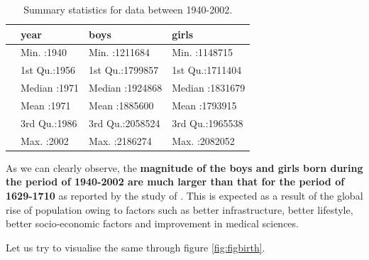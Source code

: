 \documentclass[11pt,a4paper,]{article}
\begin{document}
\begin{table}[H]

\caption{\label{tab:sumstatpre}Summary statistics for data between 1940-2002.}
\centering
\begin{tabular}[t]{l|l|l|l}
\hline
  &      year &      boys &     girls\\
\hline
 & Min.   :1940 & Min.   :1211684 & Min.   :1148715\\
\hline
 & 1st Qu.:1956 & 1st Qu.:1799857 & 1st Qu.:1711404\\
\hline
 & Median :1971 & Median :1924868 & Median :1831679\\
\hline
 & Mean   :1971 & Mean   :1885600 & Mean   :1793915\\
\hline
 & 3rd Qu.:1986 & 3rd Qu.:2058524 & 3rd Qu.:1965538\\
\hline
 & Max.   :2002 & Max.   :2186274 & Max.   :2082052\\
\hline
\end{tabular}
\end{table}

\normalsize

As we can clearly observe, the \textbf{magnitude of the boys and girls born during the period of 1940-2002 are much larger than that for the period of 1629-1710} as reported by the study of \textcite{arbuthnot1710ii}. This is expected as a result of the global rise of population owing to factors such as better infrastructure, better lifestyle, better socio-economic factors and improvement in medical sciences.

Let us try to visualise the same through figure \ref{fig:figbirth}.

\tiny
\end{document}
